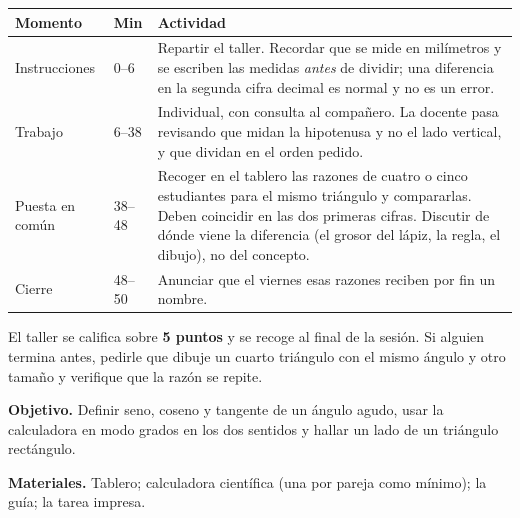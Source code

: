 \documentclass[11pt]{article}
\begin{document}
\begin{center}
{\renewcommand{\arraystretch}{1.3}
\begin{tabularx}{\linewidth}{@{}l l X@{}}
  \toprule
  \textbf{Momento} & \textbf{Min} & \textbf{Actividad}\\
  \midrule
  Instrucciones & 0--6 & Repartir el taller. Recordar que se mide en milímetros y se
    escriben las medidas \emph{antes} de dividir; una diferencia en la segunda cifra
    decimal es normal y no es un error.\\
  Trabajo & 6--38 & Individual, con consulta al compañero. La docente pasa revisando que
    midan la hipotenusa y no el lado vertical, y que dividan en el orden pedido.\\
  Puesta en común & 38--48 & Recoger en el tablero las razones de cuatro o cinco
    estudiantes para el mismo triángulo y compararlas. Deben coincidir en las dos primeras
    cifras. Discutir de dónde viene la diferencia (el grosor del lápiz, la regla, el
    dibujo), no del concepto.\\
  Cierre & 48--50 & Anunciar que el viernes esas razones reciben por fin un nombre.\\
  \bottomrule
\end{tabularx}}
\end{center}

\begin{nota}
El taller se califica sobre \textbf{5 puntos} y se recoge al final de la sesión. Si alguien
termina antes, pedirle que dibuje un cuarto triángulo con el mismo ángulo y otro tamaño y
verifique que la razón se repite.
\end{nota}


\textbf{Objetivo.} Definir seno, coseno y tangente de un ángulo agudo, usar la calculadora
en modo grados en los dos sentidos y hallar un lado de un triángulo rectángulo.

\textbf{Materiales.} Tablero; calculadora científica (una por pareja como mínimo); la guía;
la tarea impresa.
\end{document}
